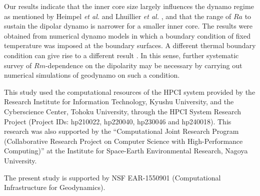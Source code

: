 Our results indicate that the inner core size largely influences the dynamo regime as mentioned by Heimpel {\it et al.} \citet{Heimpel:2005} and Lhuillier {\it et al.} \citet{Lhuillier:2019}, and that the range of $Ra$ to sustain the dipolar dynamo is narrower for a smaller inner core.
The results were obtained from numerical dynamo models in which a boundary condition of fixed temperature was imposed at the boundary surfaces.
A different thermal boundary condition can give rise to a different result
\citep{Ataru:2009,Hori:2010}.
In this sense, further systematic survey of $Rm$-dependence on the dipolarity may be necessary by carrying out numerical simulations of geodynamo on such a condition.

\begin{acknowledgements}
This study used the computational resources of the HPCI system provided by the Research Institute for Information Technology, Kyushu University, and the Cyberscience Center, Tohoku University, through the HPCI System Research Project (Project IDs: hp210022, hp220040, hp230046 and hp240018). This research was also supported by the “Computational Joint Research Program (Collaborative Research Project on Computer Science with High-Performance Computing)” at the Institute for Space-Earth Environmental Research, Nagoya University.

The present study is supported by NSF EAR-1550901 (Computational Infrastructure for Geodynamics).
\end{acknowledgements}

